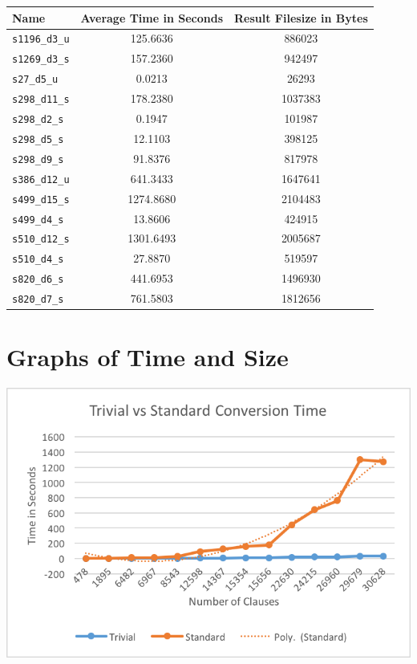 \begin{center}
\begin{tabular}{| l | S[table-format=3.2] | S[table-format=3.2] |}
\hline
\textbf{Name} & \textbf{Average Time in Seconds} & \textbf{Result Filesize in Bytes} \\ \hline
\texttt{s1196\_d3\_u} & 125.6636 & 886023 \\
\texttt{s1269\_d3\_s} & 157.2360 & 942497 \\
\texttt{s27\_d5\_u} & 0.0213 & 26293 \\
\texttt{s298\_d11\_s} & 178.2380 & 1037383 \\
\texttt{s298\_d2\_s} & 0.1947 & 101987 \\
\texttt{s298\_d5\_s} & 12.1103 & 398125 \\
\texttt{s298\_d9\_s} & 91.8376 & 817978 \\
\texttt{s386\_d12\_u} & 641.3433 & 1647641 \\
\texttt{s499\_d15\_s} & 1274.8680 & 2104483 \\
\texttt{s499\_d4\_s} & 13.8606 & 424915 \\
\texttt{s510\_d12\_s} & 1301.6493 & 2005687 \\
\texttt{s510\_d4\_s} & 27.8870 & 519597 \\
\texttt{s820\_d6\_s} & 441.6953 & 1496930 \\
\texttt{s820\_d7\_s} & 761.5803 & 1812656 \\
\hline
\end{tabular}
\end{center}

\section{Graphs of Time and Size}

\begin{center}
\includegraphics{trivialvsstandardconversiontime.png}
\end{center}

